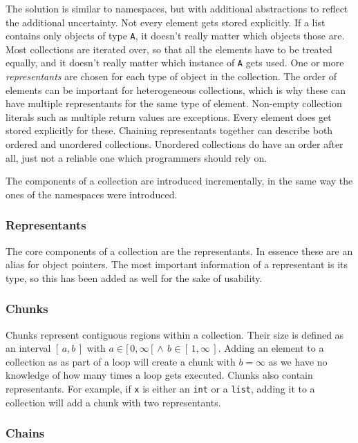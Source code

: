 \documentclass[a4paper, 16pt, oneside]{Thesis}
\begin{document}
The solution is similar to namespaces, but with additional abstractions
to reflect the additional uncertainty. Not every element gets stored
explicitly. If a list contains only objects of type \texttt{A}, it
doesn't really matter which objects those are. Most collections are
iterated over, so that all the elements have to be treated equally, and
it doesn't really matter which instance of \texttt{A} gets used. One or
more \emph{representants} are chosen for each type of object in the
collection. The order of elements can be important for heterogeneous
collections, which is why these can have multiple representants for the
same type of element. Non-empty collection literals such as multiple
return values are exceptions. Every element does get stored explicitly
for these. Chaining representants together can describe both ordered and
unordered collections. Unordered collections do have an order after all,
just not a reliable one which programmers should rely on.

The components of a collection are introduced incrementally, in the same
way the ones of the namespaces were introduced.

\subsubsection{Representants}\label{representants}

The core components of a collection are the representants. In essence
these are an alias for object pointers. The most important information
of a representant is its type, so this has been added as well for the
sake of usability.

\subsubsection{Chunks}\label{chunks}

Chunks represent contiguous regions within a collection. Their size is
defined as an interval \([\,a, b\,]\) with
\(a \in [\,0,\infty\,[ \,\wedge\, b \in [\,1, \infty\,]\). Adding an
element to a collection as as part of a loop will create a chunk with
\(b=\infty\) as we have no knowledge of how many times a loop gets
executed. Chunks also contain representants. For example, if \texttt{x}
is either an \texttt{int} or a \texttt{list}, adding it to a collection
will add a chunk with two representants.

\subsubsection{Chains}\label{chains}
\end{document}

